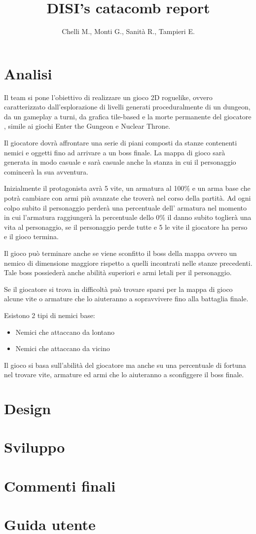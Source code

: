 \documentclass[a4paper]{report}
\title{DISI's catacomb report}
\author{Chelli M., Monti G., Sanità R., Tampieri E.}
\begin{document}
	\maketitle
	\tableofcontents
	\section{Analisi}
	\par Il team si pone l'obiettivo di realizzare un gioco 2D roguelike,
	ovvero caratterizzato dall'esplorazione di livelli generati proceduralmente
	di un dungeon, da un gameplay a turni, da grafica tile-based e la morte
	permanente del giocatore \cite{wiki:Roguelike}, simile ai giochi Enter the
	Gungeon e Nuclear Throne.
	\par Il giocatore dovrà affrontare una serie di piani composti da stanze contenenti nemici e
	oggetti fino ad arrivare a un boss finale. La mappa di gioco sarà generata
	in modo casuale e sarà casuale anche la stanza in cui il personaggio comincerà
	la sua avventura.
	\par Inizialmente il protagonista avrà 5 vite, un armatura al 100\%
	e un arma base che potrà cambiare con armi più avanzate che troverà nel corso
	della partità. Ad ogni colpo subito il personaggio perderà una percentuale dell'
	armatura nel momento in cui l'armatura raggiungerà la percentuale dello 0\%
	il danno subito toglierà una vita al personaggio, se il personaggio perde tutte
	e 5 le vite il giocatore ha perso e il gioco termina.
	\par Il gioco può terminare anche se viene sconfitto il boss della mappa ovvero
	un nemico di dimensione maggiore rispetto a quelli incontrati nelle stanze precedenti.
	Tale boss possiederà anche abilità superiori e armi letali per il personaggio.
	\par Se il giocatore si trova in difficoltà può trovare sparsi per la mappa di gioco
	alcune vite o armature che lo aiuteranno a sopravvivere fino alla battaglia finale.
	\par Esistono 2 tipi di nemici base:
	\begin{itemize}
		\item Nemici che attaccano da lontano
		\item Nemici che attaccano da vicino
	\end{itemize}
	\par Il gioco si basa sull'abilità del giocatore ma anche su una percentuale di
	fortuna nel trovare vite, armature ed armi che lo aiuteranno a sconfiggere il
	boss finale.
	\section{Design}
	\section{Sviluppo}
	\section{Commenti finali}
	\section{Guida utente}
	\printbibliography
\end{document}
